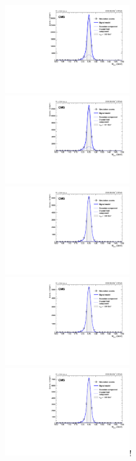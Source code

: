 		\begin{figure}[p]
		    \centering
		    \includegraphics[width=0.49\textwidth]{Fig/Fit/signal/SigFit_HJpsiG_ggF_Inclusive}~
		    \includegraphics[width=0.49\textwidth]{Fig/Fit/signal/SigFit_HJpsiG_VBF_Inclusive}\\
		    \includegraphics[width=0.49\textwidth]{Fig/Fit/signal/SigFit_HJpsiG_ZH_Inclusive}~
		    \includegraphics[width=0.49\textwidth]{Fig/Fit/signal/SigFit_HJpsiG_WplusH_Inclusive}\\
		    \includegraphics[width=0.49\textwidth]{Fig/Fit/signal/SigFit_HJpsiG_WminusH_Inclusive}!

\end{figure}
